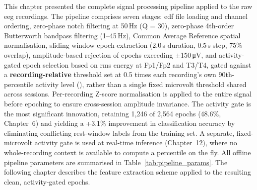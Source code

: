 This chapter presented the complete signal processing pipeline
applied to the raw \acrshort{eeg} recordings. The pipeline
comprises seven stages: \acrshort{edf} file loading and channel
ordering, zero-phase notch filtering at 50\,Hz (Q = 30), zero-phase
4th-order Butterworth bandpass filtering (1--45\,Hz), Common
Average Reference spatial normalisation, sliding window epoch
extraction (2.0\,s duration, 0.5\,s step, 75\% overlap),
amplitude-based rejection of epochs exceeding
$\pm$150\,\si{\micro\volt}, and activity-gated epoch selection
based on \acrshort{rms} energy at Fp1/Fp2 and T3/T4, gated
against a \textbf{recording-relative} threshold set at 0.5
times each recording's own 90th-percentile activity level
(), rather than a single fixed
microvolt threshold shared across sessions. Per-recording
Z-score normalisation is applied to the entire signal before
epoching to ensure cross-session amplitude invariance. The
activity gate is the most significant innovation, retaining
1{,}246 of 2{,}564 epochs (48.6\%, Chapter~6) and yielding a
+3.1\% improvement in classification accuracy by eliminating
conflicting rest-window labels from the training set. A
separate, fixed-microvolt activity gate is used at real-time
inference (Chapter~12), where no whole-recording context is
available to compute a percentile on the fly. All offline
pipeline parameters are summarised in
Table~\ref{tab:pipeline_params}. The following chapter describes
the feature extraction scheme applied to the resulting clean,
activity-gated epochs.